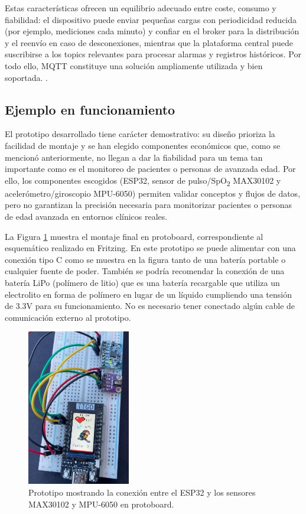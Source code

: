 \documentclass[12pt, a4paper]{article}
\begin{document}
	Estas características ofrecen un equilibrio adecuado entre coste, consumo y fiabilidad: el dispositivo puede enviar pequeñas cargas con periodicidad reducida (por ejemplo, mediciones cada minuto) y confiar en el broker para la distribución y el reenvío en caso de desconexiones, mientras que la plataforma central puede suscribirse a los topics relevantes para procesar alarmas y registros históricos. Por todo ello, MQTT constituye una solución ampliamente utilizada y bien soportada. \cite{mosquitto,hernandez2024}.

	
	\subsection{Ejemplo en funcionamiento}
	
	
	El prototipo desarrollado tiene carácter demostrativo: su diseño prioriza la facilidad de montaje y se han elegido componentes económicos que, como se mencionó anteriormente, no llegan a dar la fiabilidad para un tema tan importante como es el monitoreo de pacientes o personas de avanzada edad. Por ello, los componentes escogidos (ESP32, sensor de pulso/SpO\textsubscript{2} MAX30102 y acelerómetro/giroscopio MPU-6050) permiten validar conceptos y flujos de datos, pero no garantizan la precisión necesaria para monitorizar pacientes o personas de edad avanzada en entornos clínicos reales.
	
	La Figura \ref{fig:prototipo} muestra el montaje final en protoboard, correspondiente al esquemático realizado en Fritzing. En este prototipo se puede alimentar con una conexión tipo C como se muestra en la figura tanto de una batería portable o cualquier fuente de poder. También se podría recomendar la conexión  de una batería LiPo (polímero de litio) que es una batería recargable que utiliza un electrolito en forma de polímero en lugar de un líquido cumpliendo  una tensión de 3.3V para su funcionamiento. No es necesario tener conectado algún cable de comunicación externo al prototipo.
	
	\begin{figure}[htbp]
		\centering
		\includegraphics[width=0.4\textwidth]{images/prototipo.jpg}
		\caption[Prototipo]{Prototipo mostrando la conexión entre el ESP32 y los sensores MAX30102 y MPU-6050 en protoboard.}
		\label{fig:prototipo}
	\end{figure}
\end{document}
